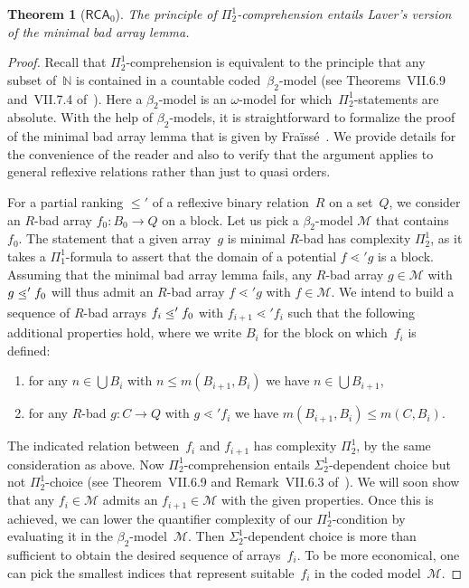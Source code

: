 \documentclass{amsart}
\newtheorem{theorem}{Theorem}
\numberwithin{theorem}{section}
\theoremstyle{definition}
\newcommand\ledot{\mathrel{\ensurestackMath{%
  \stackengine{-.5ex}{\lessdot}{-}{U}{c}{F}{F}{S}}}}
\begin{document}
\begin{theorem}[$\mathsf{RCA}_0$]\label{thm:pi12-imp-mbal}
    The principle of $\Pi^1_2$-comprehension entails Laver's version of the minimal bad array lemma.
\end{theorem}
\begin{proof}
Recall that $\Pi^1_2$-comprehension is equivalent to the principle that any subset of~$\mathbb N$ is contained in a countable coded~$\beta_2$-model (see Theorems~VII.6.9 and~VII.7.4 of~\cite{simpson09}). Here a $\beta_2$-model is an $\omega$-model for which~$\Pi^1_2$-statements are absolute. With the help of $\beta_2$-models, it is straightforward to formalize the proof of the minimal bad array lemma that is given by Fra\"iss\'e~\cite[7.3.5]{fraisse-theory-relations}. We provide details for the convenience of the reader and also to verify that the argument applies to general reflexive relations rather than just to quasi orders.

For a partial ranking $\leq'$ of a reflexive binary relation~$R$ on a set~$Q$, we consider an \mbox{$R$-bad} array $f_0:B_0\to Q$ on a block. Let us pick a $\beta_2$-model $\mathcal M$ that contains~$f_0$. The statement that a given array~$g$ is minimal $R$-bad has complexity $\Pi^1_2$, as it takes a $\Pi^1_1$-formula to assert that the domain of a potential $f\lessdot' g$ is a block. Assuming that the minimal bad array lemma fails, any $R$-bad array $g\in\mathcal M$ with $g\ledot' f_0$ will thus admit an $R$-bad array $f\lessdot' g$ with $f\in\mathcal M$. We intend to build a sequence of $R$-bad arrays $f_i\ledot'f_0$ with $f_{i+1}\lessdot' f_i$ such that the following additional properties hold, where we write $B_i$ for the block on which~$f_i$ is defined:
\begin{enumerate}[label=(\roman*)]
\item for any $n\in\bigcup B_i$ with $n\leq m(B_{i+1},B_i)$ we have $n\in\bigcup B_{i+1}$,
\item for any $R$-bad $g:C\to Q$ with $g\lessdot' f_i$ we have $m(B_{i+1},B_i)\leq m(C,B_i)$.
\end{enumerate}
The indicated relation between~$f_i$ and $f_{i+1}$ has complexity $\Pi^1_2$, by the same consideration as above. Now $\Pi^1_2$-comprehension entails $\Sigma^1_2$-dependent choice but not $\Pi^1_2$-choice (see Theorem~VII.6.9 and Remark~VII.6.3 of~\cite{simpson09}). We will soon show that any $f_i\in\mathcal M$ admits an $f_{i+1}\in\mathcal M$ with the given properties. Once this is achieved, we can lower the quantifier complexity of our $\Pi^1_2$-condition by evaluating it in the $\beta_2$-model~$\mathcal M$. Then $\Sigma^1_2$-dependent choice is more than sufficient to obtain the desired sequence of arrays~$f_i$. To be more economical, one can pick the smallest indices that represent suitable~$f_i$ in the coded model~$\mathcal M$.


\end{proof}
\end{document}
